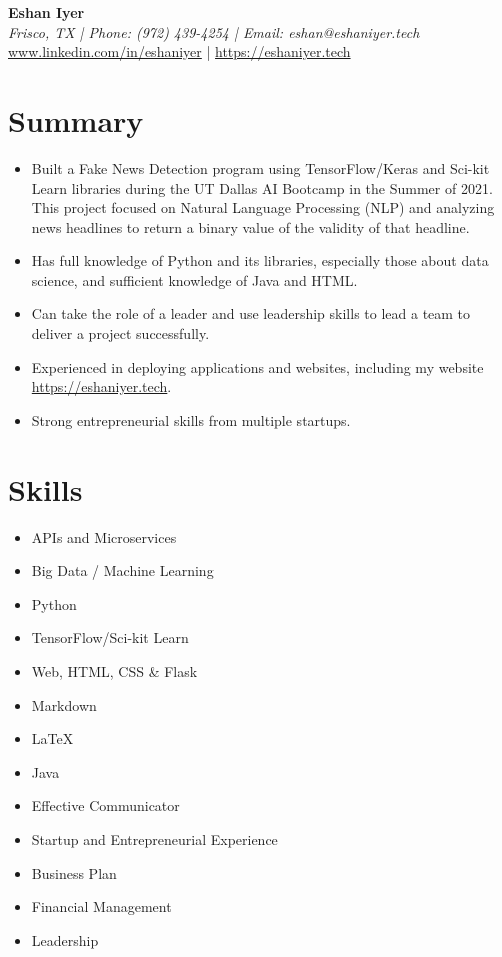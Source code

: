 \documentclass[a4paper, 10pt]{article}
\begin{document}
\pagestyle{empty}

\begin{center}
    \textbf{\LARGE Eshan Iyer}\\
    \textit{Frisco, TX | Phone: (972) 439-4254 | Email: eshan@eshaniyer.tech}\\
    \url{www.linkedin.com/in/eshaniyer} | \url{https://eshaniyer.tech}
\end{center}

\section*{Summary}
\begin{itemize}[left=0pt, itemsep=0pt, label={\textbullet}]
    \item Built a Fake News Detection program using TensorFlow/Keras and Sci-kit Learn libraries during the UT Dallas AI Bootcamp in the Summer of 2021. This project focused on Natural Language Processing (NLP) and analyzing news headlines to return a binary value of the validity of that headline.
    
    \item Has full knowledge of Python and its libraries, especially those about data science, and sufficient knowledge of Java and HTML.
    
    \item Can take the role of a leader and use leadership skills to lead a team to deliver a project successfully.
    
    \item Experienced in deploying applications and websites, including my website \url{https://eshaniyer.tech}.
    
    \item Strong entrepreneurial skills from multiple startups.
\end{itemize}

\section*{Skills}
\begin{itemize}[left=0pt, itemsep=0pt, label={\textbullet}]
    \item APIs and Microservices
    \item Big Data / Machine Learning
    \item Python
    \item TensorFlow/Sci-kit Learn
    \item Web, HTML, CSS \& Flask
    \item Markdown
    \item LaTeX
    \item Java
    \item Effective Communicator
    \item Startup and Entrepreneurial Experience
    \item Business Plan
    \item Financial Management
    \item Leadership
\end{itemize}
\end{document}
